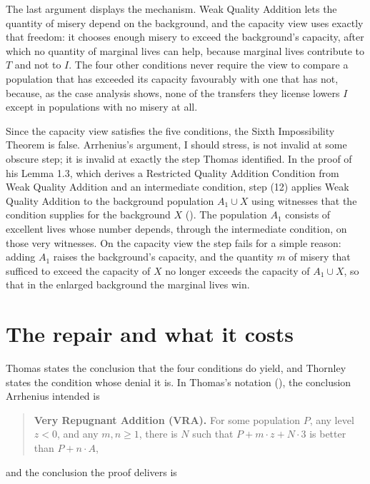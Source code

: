 \documentclass[
  11pt,
  letterpaper,
  DIV=11,
  numbers=noendperiod,
  twoside]{scrartcl}
\newcounter{none} %
\begin{document}
The last argument displays the mechanism. Weak Quality Addition lets the
quantity of misery depend on the background, and the capacity view uses
exactly that freedom: it chooses enough misery to exceed the
background's capacity, after which no quantity of marginal lives can
help, because marginal lives contribute to \(T\) and not to \(I\). The
four other conditions never require the view to compare a population
that has exceeded its capacity favourably with one that has not,
because, as the case analysis shows, none of the transfers they license
lowers \(I\) except in populations with no misery at all.

Since the capacity view satisfies the five conditions, the Sixth
Impossibility Theorem is false. Arrhenius's argument, I should stress,
is not invalid at some obscure step; it is invalid at exactly the step
Thomas identified. In the proof of his Lemma 1.3, which derives a
Restricted Quality Addition Condition from Weak Quality Addition and an
intermediate condition, step (12) applies Weak Quality Addition to the
background population \(A_1 \cup X\) using witnesses that the condition
supplies for the background \(X\)
(). The population
\(A_1\) consists of excellent lives whose number depends, through the
intermediate condition, on those very witnesses. On the capacity view
the step fails for a simple reason: adding \(A_1\) raises the
background's capacity, and the quantity \(m\) of misery that sufficed to
exceed the capacity of \(X\) no longer exceeds the capacity of
\(A_1 \cup X\), so that in the enlarged background the marginal lives
win.

\section{The repair and what it costs}\label{sec-repair}

Thomas states the conclusion that the four conditions do yield, and
Thornley states the condition whose denial it is. In Thomas's notation
(), the conclusion Arrhenius intended
is

\begin{quote}
\textbf{Very Repugnant Addition (VRA).} For some population \(P\), any
level \(z < 0\), and any \(m, n \geq 1\), there is \(N\) such that
\(P + m \cdot z + N \cdot 3\) is better than \(P + n \cdot A\),
\end{quote}

and the conclusion the proof delivers is
\end{document}
